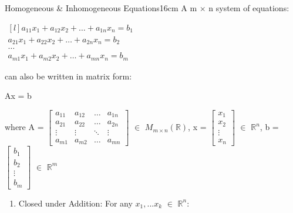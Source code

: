     \begin{definition}{Homogeneous \& Inhomogeneous Equations}{16cm}
        A m $\times$ n system of equations: 

        \hspace{0.5cm}
        $\begin{matrix*}[l]
            a_{11}x_1 + a_{12}x_2 + \hdots + a_{1n}x_n = b_1 \\
            a_{21}x_1 + a_{22}x_2 + \hdots + a_{2n}x_n = b_2 \\
            \hdots \\
            a_{m1}x_1 + a_{m2}x_2 + \hdots + a_{mn}x_n = b_m
        \end{matrix*}$
        
        can also be written in {\color{lblue} matrix form}:

        \hspace{0.5cm}
        Ax = b

        \hspace{0.5cm}
        where A =
        $\begin{bmatrix}
            a_{11} & a_{12} & \hdots & a_{1n} \\
            a_{21} & a_{22} & \hdots & a_{2n} \\
            \vdots & \vdots & \ddots & \vdots \\
            a_{m1} & a_{m2} & \hdots & a_{mn}
        \end{bmatrix}$ $\in$ $M_{m \times n}(\mathbb{R})$,
        \hspace{0.2cm}
        x = 
        $\begin{bmatrix}
            x_1 \\
            x_2 \\
            \vdots \\
            x_n
        \end{bmatrix}$ $\in$ $\mathbb{R}^n$,
        \hspace{0.2cm}
        b =
        $\begin{bmatrix}
            b_1 \\
            b_2 \\
            \vdots \\
            b_m
        \end{bmatrix}$ $\in$ $\mathbb{R}^m$

        \begin{enumerate}[label=(\alph*), leftmargin=1cm, itemsep=0.1cm]
            \item {\color{lgreen} Closed under Addition}:
                For any $x_1,...x_k$ $\in$ $\mathbb{R}^n$:


\end{enumerate}
\end{definition}
